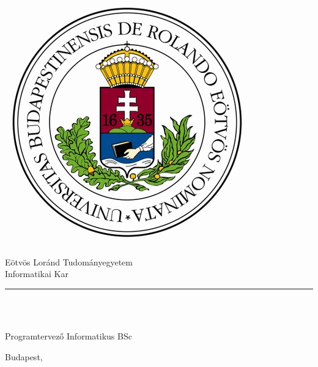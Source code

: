 \begin{titlepage}

\begin{minipage}{0.40\linewidth}
\includegraphics[scale=0.3]{img/elte-cimer}
\end{minipage}
\begin{minipage}{0.50\linewidth}
\begin{center}
Eötvös Loránd Tudományegyetem \\
Informatikai Kar \\
\DEPARTMENT
\end{center}
\end{minipage}

\hrule
\vfill

\begin{center}
\Huge
\textbf{\THESISTITLE}
\normalsize
\end{center}

\vfill

\begin{minipage}[t]{0.5\linewidth}
\begin{flushleft}
\textbf{\SUPERVISOR} \\
\SUPERVISORPOSITION
\end{flushleft}
\end{minipage}
\begin{minipage}[t]{0.5\linewidth}
\begin{flushright}
\textbf{\THESISAUTHOR} \\
Programtervező Informatikus BSc
\end{flushright}
\end{minipage}

\vfill

\begin{center}
Budapest, \THESISDEFENCEYEAR
\end{center}

\end{titlepage}
